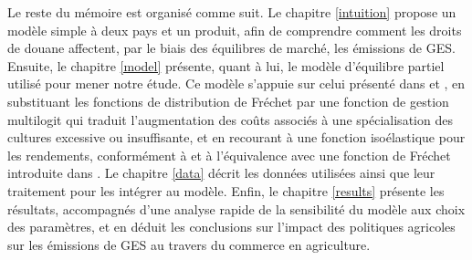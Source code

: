 Le reste du mémoire est organisé comme suit. Le chapitre \ref{intuition} propose un modèle simple à deux pays et un produit, afin de comprendre comment les droits de douane affectent, par le biais des équilibres de marché, les émissions de GES. Ensuite, le chapitre \ref{model} présente, quant à lui, le modèle d’équilibre partiel utilisé pour mener notre étude. Ce modèle s’appuie sur celui présenté dans \cite{Gouel2021} et \cite{Gouel2025}, en substituant les fonctions de distribution de Fréchet par une fonction de gestion multilogit qui traduit l’augmentation des coûts associés à une spécialisation des cultures excessive ou insuffisante, et en recourant à une fonction isoélastique pour les rendements, conformément à \cite{Carpentier2013} et à l’équivalence avec une fonction de Fréchet introduite dans \cite{Gouel202x}. Le chapitre \ref{data} décrit les données utilisées ainsi que leur traitement pour les intégrer au modèle. Enfin, le chapitre \ref{results} présente les résultats, accompagnés d’une analyse rapide de la sensibilité du modèle aux choix des paramètres, et en déduit les conclusions sur l’impact des politiques agricoles sur les émissions de GES au travers du commerce en agriculture.
